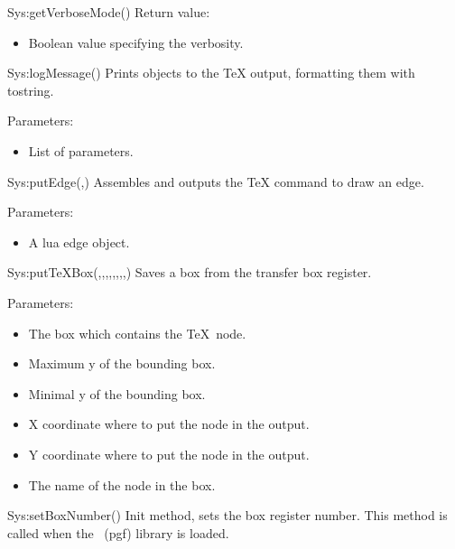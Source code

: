 \begin{luacommand}{{Sys:getVerboseMode}()}
Return value:
\begin{itemize} \item[] Boolean value specifying the verbosity. \end{itemize}


\end{luacommand}\begin{luacommand}{{Sys:logMessage}()}
Prints objects to the TeX output, formatting them with tostring.

Parameters:
\begin{itemize}
	\item[]  \subitem List of parameters.
\end{itemize}



\end{luacommand}\begin{luacommand}{{Sys:putEdge}(,)}
Assembles and outputs the TeX command to draw an edge.

Parameters:
\begin{itemize}
	\item[]  \subitem A lua edge object.
\end{itemize}



\end{luacommand}\begin{luacommand}{{Sys:putTeXBox}(,,,,,,,,)}
Saves a box from the transfer box register.

Parameters:
\begin{itemize}
	\item[]  \subitem The box which contains the \TeX\ node.\item[]  \subitem Maximum y of the bounding box.\item[]  \subitem Minimal y of the bounding box.\item[]  \subitem X coordinate where to put the node in the output.\item[]  \subitem Y coordinate where to put the node in the output.\item[]  \subitem The name of the node in the box.
\end{itemize}



\end{luacommand}\begin{luacommand}{{Sys:setBoxNumber}()}
Init method, sets the box register number. This method is called when the \tikzname\ (pgf) library is loaded.


\end{luacommand}
